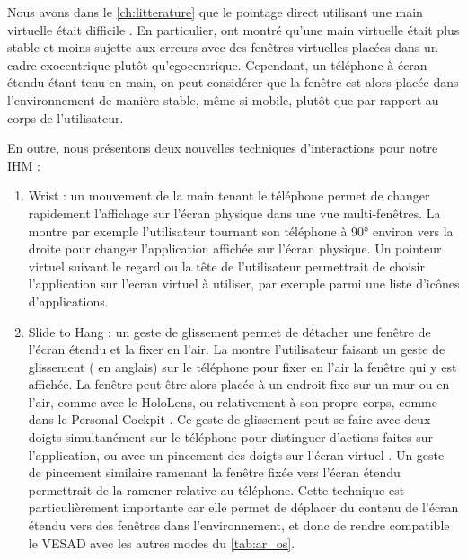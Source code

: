 Nous avons dans le \autoref{ch:litterature} que le pointage direct utilisant une main virtuelle était difficile \citep{Chan2010}. En particulier, \cite{Ens2014} ont montré qu'une main virtuelle était plus stable et moins sujette aux erreurs avec des fenêtres virtuelles placées dans un cadre exocentrique plutôt qu'egocentrique. Cependant, un téléphone à écran étendu étant tenu en main, on peut considérer que la fenêtre est alors placée dans l'environnement de manière stable, même si mobile, plutôt que par rapport au corps de l'utilisateur.


En outre, nous présentons deux nouvelles techniques d'interactions pour notre IHM :
\begin{enumerate}
  \item Wrist : un mouvement de la main tenant le téléphone permet de changer rapidement l'affichage sur l'écran physique dans une vue multi-fenêtres. La  montre par exemple l'utilisateur tournant son téléphone à \ang{90} environ vers la droite pour changer l'application affichée sur l'écran physique. Un pointeur virtuel suivant le regard ou la tête de l'utilisateur permettrait de choisir l'application sur l'ecran virtuel à utiliser, par exemple parmi une liste d'icônes d'applications.
  \item Slide to Hang : un geste de glissement permet de détacher une fenêtre de l'écran étendu et la fixer en l'air. La  montre l'utilisateur faisant un geste de glissement ( en anglais) sur le téléphone pour fixer en l'air la fenêtre qui y est affichée. La fenêtre peut être alors placée à un endroit fixe sur un mur ou en l'air, comme avec le HoloLens, ou relativement à son propre corps, comme dans le Personal Cockpit \cite{Ens2014}. Ce geste de glissement peut se faire avec deux doigts simultanément sur le téléphone pour distinguer d'actions faites sur l'application, ou avec un pincement des doigts sur l'écran virtuel \cite{Piumsomboon2014}. Un geste de pincement similaire ramenant la fenêtre fixée vers l'écran étendu permettrait de la ramener relative au téléphone. Cette technique est particulièrement importante car elle permet de déplacer du contenu de l'écran étendu vers des fenêtres dans l'environnement, et donc de rendre compatible le VESAD avec les autres modes du \autoref{tab:ar_os}.
\end{enumerate}